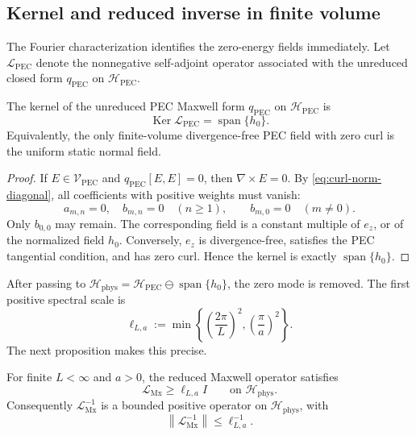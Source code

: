 \documentclass[11pt]{article}
\providecommand{\Ker}{\operatorname{Ker}}
\providecommand{\norm}[1]{\left\lVert #1\right\rVert}
\providecommand{\set}[1]{\left\{#1\right\}}
\providecommand{\paren}[1]{\left(#1\right)}
\providecommand{\Hphys}{\mathcal H_{\mathrm{phys}}}
\providecommand{\HPEC}{\mathcal H_{\mathrm{PEC}}}
\providecommand{\VPEC}{\mathcal V_{\mathrm{PEC}}}
\providecommand{\hzero}{h_0}
\providecommand{\qPEC}{q_{\mathrm{PEC}}}
\providecommand{\LPEC}{\mathcal L_{\mathrm{PEC}}}
\providecommand{\LMx}{\mathcal L_{\mathrm{Mx}}}
\numberwithin{equation}{section}
\begin{document}
\subsection{Kernel and reduced inverse in finite volume}
\label{subsec:kernel-and-gap}

The Fourier characterization identifies the zero-energy fields immediately.  Let \(\LPEC\) denote the nonnegative self-adjoint operator associated with the unreduced closed form \(\qPEC\) on \(\HPEC\).

\begin{proposition}
\label{prop:unreduced-kernel}
The kernel of the unreduced PEC Maxwell form \(\qPEC\) on \(\HPEC\) is
\[
    \Ker \LPEC=\operatorname{span}\{\hzero\} .
\]
Equivalently, the only finite-volume divergence-free PEC field with zero curl is the uniform static normal field.
\end{proposition}

\begin{proof}
If \(E\in\VPEC\) and \(\qPEC[E,E]=0\), then \(\nabla\times E=0\).  By \eqref{eq:curl-norm-diagonal}, all coefficients with positive weights must vanish:
\[
    a_{m,n}=0,
    \quad
    b_{m,n}=0
    \quad(n\ge1),
    \qquad
    b_{m,0}=0
    \quad(m\ne0).
\]
Only \(b_{0,0}\) may remain.  The corresponding field is a constant multiple of \(e_z\), or of the normalized field \(\hzero\).  Conversely, \(e_z\) is divergence-free, satisfies the PEC tangential condition, and has zero curl.  Hence the kernel is exactly \(\operatorname{span}\{\hzero\}\).
\end{proof}

After passing to \(\Hphys=\HPEC\ominus\operatorname{span}\{\hzero\}\), the zero mode is removed.  The first positive spectral scale is
\begin{equation}
\label{eq:finite-gap-ell-La}
    \ell_{L,a}
    :=
    \min\set{
        \paren{\frac{2\pi}{L}}^2,
        \paren{\frac{\pi}{a}}^2
    } .
\end{equation}
The next proposition makes this precise.

\begin{proposition}
\label{prop:finite-volume-gap}
For finite \(L<\infty\) and \(a>0\), the reduced Maxwell operator satisfies
\begin{equation}
\label{eq:LMx-gap}
    \LMx\ge \ell_{L,a} I
    \qquad\text{on }\Hphys .
\end{equation}
Consequently \(\LMx^{-1}\) is a bounded positive operator on \(\Hphys\), with
\begin{equation}
\label{eq:LMx-inverse-bound}
    \norm{\LMx^{-1}}
    \le
    \ell_{L,a}^{-1} .
\end{equation}
\end{proposition}
\end{document}
